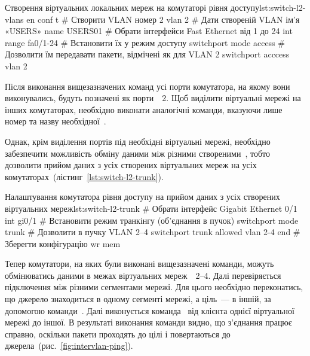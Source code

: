 \documentclass[
  ukrainian,
  simple,
  floatsection,
]{eskdnaukvd}
\begin{document}
      \begin{listingplaintext}{Створення віртуальних локальних мереж на комутаторі рівня доступу}{lst:switch-l2-vlans}
        en
        conf t
        # Створити VLAN номер 2
        vlan 2
        # Дати створеній VLAN ім'я «USERS»
        name USERS01
        # Обрати інтерфейси Fast Ethernet від 1 до 24
        int range fa0/1-24
        # Встановити їх у режим доступу
        switchport mode access
        # Дозволити їм передавати пакети, відмічені як для VLAN 2
        switchport acccess vlan 2
      \end{listingplaintext}

      Після виконання вищезазначених команд усі порти комутатора, на якому вони виконувались, будуть позначені як порти~\textenglish{}~2. Щоб виділити віртуальні мережі на інших комутаторах, необхідно виконати аналогічні команди, вказуючи лише номер та назву необхідної~\textenglish{}.

      Однак, крім виділення портів під необхідні віртуальні мережі, необхідно забезпечити можливість обміну даними між різними створеними~\textenglish{}, тобто дозволити прийом даних з усіх створених віртуальних мереж на усіх комутаторах~(лістинг~\ref{lst:switch-l2-trunk}).

      \begin{listingplaintext}{Налаштування комутатора рівня доступу на прийом даних з усіх створених віртуальних мереж}{lst:switch-l2-trunk}
        # Обрати інтерфейс Gigabit Ethernet 0/1
        int gi0/1
        # Встановити режим транкінгу (об'єднання в пучок)
        switchport mode trunk
        # Дозволити в пучку VLAN 2–4
        switchport trunk allowed vlan 2-4
        end
        # Зберегти конфігурацію
        wr mem
      \end{listingplaintext}
      Тепер комутатори, на яких були виконані вищезазначені команди, можуть обмінюватись даними в межах віртуальних мереж~\textenglish{}~2–4. Далі перевіряється підключення між різними сегментами мережі. Для цього необхідно переконатись, що джерело знаходиться в одному сегменті мережі, а ціль~— в іншій, за допомогою команди~. Далі виконується команда~ від клієнта однієї віртуальної мережі до іншої. В результаті виконання команди видно, що з'єднання працює справно, оскільки пакети проходять до цілі і повертаються до джерела~(рис.~\ref{fig:intervlan-ping}).
\end{document}

